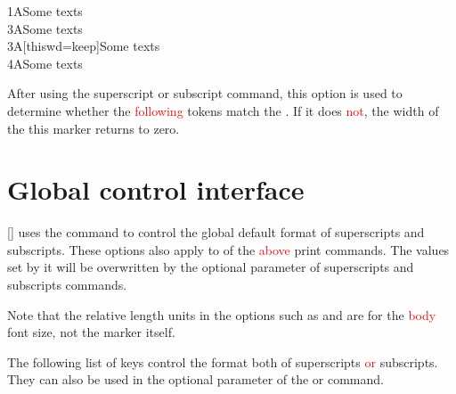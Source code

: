 \documentclass[load-preamble+]{cnltx-doc}
\renewcommand{\emph}[1]{\textcolor{red}{#1}}
\begin{document}
\begin{options}
\begin{example}
  1ASome texts \\
  3ASome texts \\
  3A[thiswd=keep]Some texts \\
  4ASome texts
  \end{example}
  After using the superscript or subscript command, this option is used to determine whether the \textcolor{red}{following} tokens match the . If it does \textcolor{red}{not}, the width of the this marker returns to zero.
  \begin{example}
  \newcommand{\mysp}[2][]{\super[regex=\c{mysb},#1]{#2}}
  \newcommand{\mysb}[2][]{\sub[regex=\c{mysp},#1]{#2}}
  \end{example}
\end{options}

\section{Global control interface}
\label{sec:global control interface}
\begin{commands}
  []
   uses the  command to control the global default format of superscripts and subscripts. These options also apply to  of the \textcolor{red}{above} print commands. The values set by it will be overwritten by the optional parameter of superscripts and subscripts commands.

  Note that the relative length units in the options such as  and  are for the \textcolor{red}{body} font size, not the marker itself.

  The following list of keys control the format both of superscripts \emph{or} subscripts. They can also be used in the optional parameter of the  or  command.
\end{commands}
\end{document}
